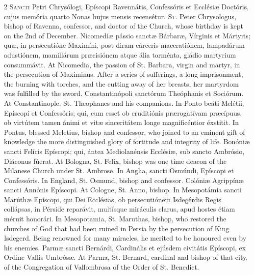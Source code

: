 \begin{paracol}{2}
\lettrine[lines=2]{S}{ancti} Petri Chrysólogi, 
 Epíscopi Ravennátis, Confessóris et Ecclésiæ Doctóris, cujus memória quarto 
 Nonas hujus mensis recensétur.
\switchcolumn
{}
\lettrine[lines=2]{S}{t.} Peter Chrysologus, bishop of 
 Ravenna, confessor, and doctor of the Church, whose birthday is kept on the 
 2nd of December.
\switchcolumn*
{}
Nicomedíæ pássio sanctæ 
 Bárbaræ, Vírginis et Mártyris; quæ, in persecutióne Maximíni, post diram cárceris maceratiónem, lampadárum adustiónem, mamillárum præcisiónem atque 
 ália torménta, gládio martyrium consummávit.
\switchcolumn
{}
At Nicomedia, the passion of St. 
 Barbara, virgin and martyr, in the persecution of Maximinus. After a 
 series of sufferings, a long imprisonment, the burning with torches, and the 
 cutting away of her breasts, her martyrdom was fulfilled by the sword.
\switchcolumn*
{}
Constantinópoli 
 sanctórum Theóphanis et Sociórum.
\switchcolumn
{}
At Constantinople, St. Theophanes 
 and his companions.
\switchcolumn*
{}
In Ponto beáti Melétii, 
 Epíscopi et Confessóris; qui, cum esset ob eruditiónis prærogatívam 
 præcípuus, ob virtútem tamen ánimi et vitæ sinceritátem longe magnificéntior 
 éxstitit.
\switchcolumn
{}
In Pontus, blessed Meletius, bishop 
 and confessor, who joined to an eminent gift of knowledge the more 
 distinguished glory of fortitude and integrity of life.
\switchcolumn*
{}
Bonóniæ sancti Felícis Epíscopi; qui, ántea Mediolanénsis Ecclésiæ, sub sancto
  Ambrósio, Diáconus fúerat.
\switchcolumn
{}
At Bologna, St. Felix, bishop was 
 one time deacon of the Milanese Church under St. Ambrose.
\switchcolumn*
{}
In Anglia, sancti 
 Osmúndi, Epíscopi et Confessóris.
\switchcolumn
{}
In England, St. Osmund, bishop and 
 confessor.
\switchcolumn*
{}
Colóniæ Agrippínæ 
 sancti Annónis Epíscopi.
\switchcolumn
{}
At Cologne, St. Anno, bishop.
\switchcolumn*
{}
In Mesopotámia sancti 
 Marúthæ Epíscopi, qui Dei Ecclésias, ob persecutiónem Isdegérdis Regis 
 collápsas, in Pérside reparávit, multísque miráculis clarus, apud hostes 
 étiam méruit honorári.
\switchcolumn
{}
In Mesopotamia, St. Maruthas, 
 bishop, who restored the churches of God that had been ruined in Persia by 
 the persecution of King Isdegerd. Being renowned for many miracles, he 
 merited to be honoured even by his enemies.
\switchcolumn*
{}
Parmæ sancti Bernárdi, 
 Cardinális et ejúsdem civitátis Epíscopi, ex Ordine Vallis Umbrósæ.
\switchcolumn
{}
At Parma, St. Bernard, cardinal and 
 bishop of that city, of the Congregation of Vallombrosa of the Order of St. 
 Benedict.
\switchcolumn*
{}
\end{paracol}



